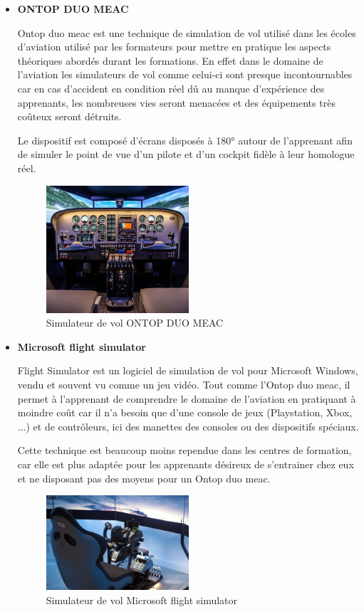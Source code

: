 \begin{itemize}
	\item \textbf{ONTOP DUO MEAC}

		Ontop duo meac est une technique de simulation de vol utilisé dans les écoles d’aviation utilisé par les formateurs pour mettre en pratique les aspects théoriques abordés durant les formations. En effet dans le domaine de l’aviation les simulateurs de vol comme celui-ci sont presque incontournables car en cas d’accident en condition réel dû au manque d’expérience des apprenants, les nombreuses vies seront menacées et des équipements très coûteux seront détruits.

		Le dispositif est composé d'écrans disposés à 180° autour de l’apprenant afin de simuler le point de vue d’un pilote et d’un cockpit fidèle à leur homologue réel.

	      \begin{figure}[H]
		      \centering
		      \includegraphics[width=0.5\textwidth]{img/svol1}
		      \caption{Simulateur de vol ONTOP DUO MEAC}
		      \label{fig:mesh1}
	      \end{figure}

	\item \textbf{Microsoft flight simulator}

	Flight Simulator est un logiciel de simulation de vol pour Microsoft Windows, vendu et souvent vu comme un jeu vidéo. Tout comme l'Ontop duo meac, il permet à l'apprenant de comprendre le domaine de l’aviation en pratiquant à moindre coût car il n’a besoin que d’une console de jeux (Playstation, Xbox, ...) et de contrôleurs, ici des manettes des consoles ou des dispositifs spéciaux.

	Cette technique est beaucoup moins rependue dans les centres de formation, car elle est plus adaptée pour les apprenants désireux de s’entrainer chez eux et ne disposant pas des moyens pour un Ontop duo meac.

	      \begin{figure}[H]
		      \centering
		      \includegraphics[width=0.5\textwidth]{img/svol2}
		      \caption{Simulateur de vol Microsoft flight simulator}
		      \label{fig:mesh1}
	      \end{figure}


\end{itemize}

